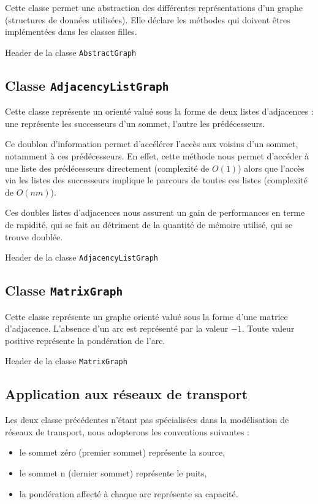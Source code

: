 Cette classe permet une abstraction des différentes représentations d'un graphe (structures de données utilisées). Elle déclare les méthodes qui doivent êtres implémentées dans les classes filles.

Header de la classe \texttt{AbstractGraph}



\subsection{Classe \texttt{AdjacencyListGraph}}
Cette classe représente un orienté valué sous la forme
de deux listes d'adjacences : une représente les 
successeurs d'un sommet, l'autre les prédécesseurs.

Ce doublon d'information permet d'accélérer l'accès aux voisins d'un sommet, notamment à ces prédécesseurs. En effet, cette méthode nous permet d'accéder à une liste des prédécesseurs directement (complexité de $O(1)$) alors que l'accès via les listes des successeurs implique le parcours de toutes ces listes (complexité de $O(nm)$).

Ces doubles listes d'adjacences nous assurent un gain de performances en terme de rapidité, qui se fait au détriment de la quantité de mémoire utilisé, qui se trouve doublée.

Header de la classe \texttt{AdjacencyListGraph}




\subsection{Classe \texttt{MatrixGraph}}

Cette classe représente un graphe orienté valué sous la forme d'une matrice d'adjacence. L'absence d'un arc est représenté par la valeur $-1$. Toute valeur positive représente la pondération de l'arc.

Header de la classe \texttt{MatrixGraph}



\subsection{Application aux réseaux de transport}
Les deux classe précédentes n'étant pas spécialisées dans la modélisation de réseaux de transport, nous adopterons les conventions suivantes :
\begin{itemize}
\item le sommet zéro (premier sommet) représente la source,
\item le sommet n (dernier sommet) représente le puits,
\item la pondération affecté à chaque arc représente sa capacité.
\end{itemize}


